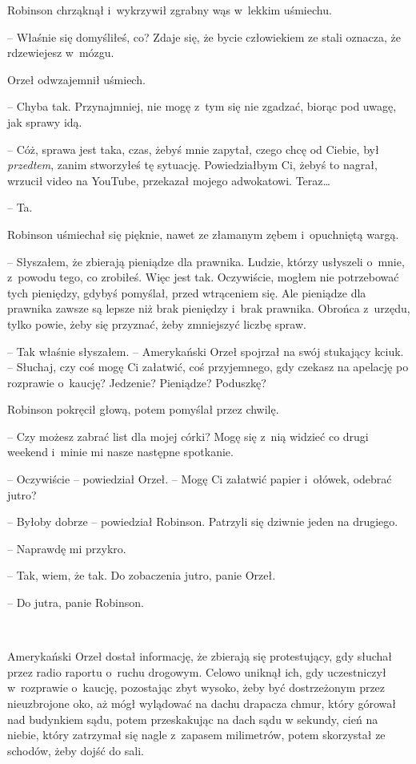 \documentclass[oneside,polish,11pt,sfheadings]{mwbk}
\begin{document}
Robinson chrząknął i~wykrzywił zgrabny wąs w~lekkim uśmiechu. 

-- Właśnie
się domyśliłeś, co? Zdaje się, że bycie człowiekiem ze stali oznacza, że
rdzewiejesz w~mózgu.

Orzeł odwzajemnił uśmiech. 

-- Chyba tak. Przynajmniej, nie mogę z~tym się
nie zgadzać, biorąc pod uwagę, jak sprawy idą.

-- Cóż, sprawa jest taka, czas, żebyś mnie zapytał, czego chcę od Ciebie,
był \textit{przedtem}, zanim stworzyłeś tę sytuację. Powiedziałbym Ci,
żebyś to nagrał, wrzucił video na YouTube, przekazał mojego adwokatowi.
Teraz\ldots 

-- Ta.

Robinson uśmiechał się pięknie, nawet ze złamanym zębem i~opuchniętą
wargą. 

-- Słyszałem, że zbierają pieniądze dla prawnika. Ludzie, którzy
usłyszeli o~mnie, z~powodu tego, co zrobiłeś. Więc jest tak. Oczywiście,
mogłem nie potrzebować tych pieniędzy, gdybyś pomyślał, przed wtrąceniem
się. Ale pieniądze dla prawnika zawsze są lepsze niż brak pieniędzy i~brak prawnika. Obrońca z~urzędu, tylko powie, żeby się przyznać, żeby
zmniejszyć liczbę spraw.

-- Tak właśnie słyszałem. -- Amerykański Orzeł spojrzał na swój stukający
kciuk. -- Słuchaj, czy coś mogę Ci załatwić, coś przyjemnego, gdy czekasz
na apelację po rozprawie o~kaucję? Jedzenie? Pieniądze? Poduszkę?

Robinson pokręcił głową, potem pomyślał przez chwilę. 

-- Czy możesz
zabrać list dla mojej córki? Mogę się z~nią widzieć co drugi weekend i~minie mi nasze następne spotkanie.

-- Oczywiście -- powiedział Orzeł. -- Mogę Ci załatwić papier i~ołówek,
odebrać jutro?

-- Byłoby dobrze -- powiedział Robinson. Patrzyli się dziwnie jeden na
drugiego.

-- Naprawdę mi przykro.

-- Tak, wiem, że tak. Do zobaczenia jutro, panie Orzeł.

-- Do jutra, panie Robinson.

~

Amerykański Orzeł dostał informację, że zbierają się protestujący, gdy
słuchał przez radio raportu o~ruchu drogowym. Celowo uniknął ich, gdy
uczestniczył w~rozprawie o~kaucję, pozostając zbyt wysoko, żeby być
dostrzeżonym przez nieuzbrojone oko, aż mógł wylądować na dachu drapacza
chmur, który górował nad budynkiem sądu, potem przeskakując na dach sądu
w sekundy, cień na niebie, który zatrzymał się nagle z~zapasem
milimetrów, potem skorzystał ze schodów, żeby dojść do sali.
\end{document}
